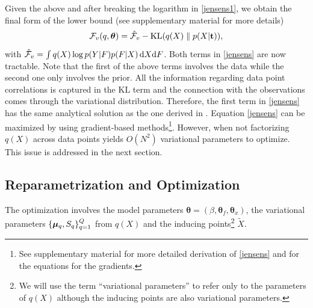 \documentclass{article} %
\begin{document}
Given the above and after breaking the logarithm in \eqref{jensens1},
we obtain the final form of the lower bound (see supplementary
material for more details)
%
\begin{equation}
\label{jensens}
\mathcal{F}_v(q, \boldsymbol \theta) = 
\hat{\mathcal{F}}_v - \text{KL}(q(X) \parallel p(X|\mathbf{t})),
\end{equation}
%
with $\hat{\mathcal{F}}_v =\int q(X) \log p( Y | F ) p( F | X) \,
\mathrm{d} X \text{d} F$. Both terms in \eqref{jensens} are now
tractable. Note that the first of the above terms involves the data while
the second one only involves the prior. All the information regarding
data point correlations is captured in the $\text{KL}$ term and the
connection with the observations comes through the variational
distribution. Therefore, the first term in \eqref{jensens} has the
same analytical solution as the one derived in \cite{BayesianGPLVM}.
%
Equation \eqref{jensens} can be maximized by using gradient-based
methods\footnote{See supplementary material for more detailed
  derivation of \eqref{jensens} and for the equations for the
  gradients.}. However, when not factorizing $q(X)$ across data points
yields $O(N^2)$ variational parameters to optimize. 
This issue is addressed in the next section.



\subsection{Reparametrization and Optimization \label{optimisation}} 

The optimization involves the model parameters $\boldsymbol \theta =
(\beta, \boldsymbol \theta_f, \boldsymbol \theta_x)$, the variational
parameters $\{ \boldsymbol \mu_q, S_q \}_{q=1}^Q$ from $q(X)$ and the inducing
points\footnote{We will use the term ``variational parameters'' to
  refer only to the parameters of $q(X)$ although the inducing points
  are also variational parameters.} $\tilde{X}$.
\end{document}
